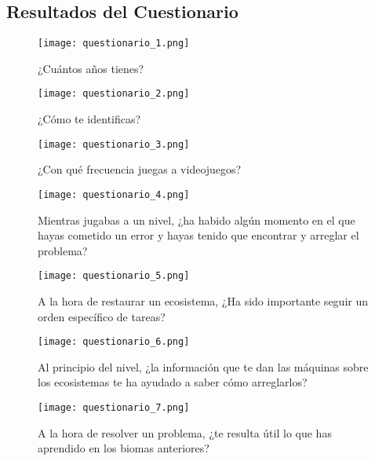 \subsection{Resultados del Cuestionario}
\begin{figure}[H]
  \centering
  \texttt{[image: questionario\_1.png]}
  \caption{¿Cuántos años tienes?}
  \label{fig:questionario_1}
\end{figure}
\raggedbottom

\begin{figure}[H]
  \centering
  \texttt{[image: questionario\_2.png]}
  \caption{¿Cómo te identificas?}
  \label{fig:questionario_2}
\end{figure}
\raggedbottom

\begin{figure}[H]
  \centering
  \texttt{[image: questionario\_3.png]}
  \caption{¿Con qué frecuencia juegas a videojuegos?}
  \label{fig:questionario_3}
\end{figure}
\raggedbottom

\begin{figure}[H]
  \centering
  \texttt{[image: questionario\_4.png]}
  \caption{Mientras jugabas a un nivel, ¿ha habido algún momento en el que hayas cometido un error y hayas tenido que encontrar y arreglar el problema?}
  \label{fig:questionario_4}
\end{figure}
\raggedbottom

\begin{figure}[H]
  \centering
  \texttt{[image: questionario\_5.png]}
  \caption{A la hora de restaurar un ecosistema, ¿Ha sido importante seguir un orden específico de tareas?}
  \label{fig:questionario_5}
\end{figure}
\raggedbottom

\begin{figure}[H]
  \centering
  \texttt{[image: questionario\_6.png]}
  \caption{Al principio del nivel, ¿la información que te dan las máquinas sobre los ecosistemas te ha ayudado a saber cómo arreglarlos?}
  \label{fig:questionario_6}
\end{figure}
\raggedbottom

\begin{figure}[H]
  \centering
  \texttt{[image: questionario\_7.png]}
  \caption{A la hora de resolver un problema, ¿te resulta útil lo que has aprendido en los biomas anteriores?}
  \label{fig:questionario_7}
\end{figure}
\raggedbottom

